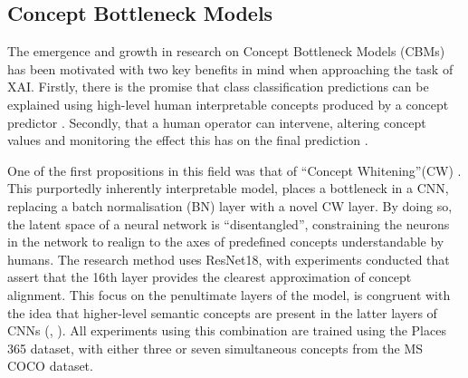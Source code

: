 \subsection{Concept Bottleneck Models}

The emergence and growth in research on Concept Bottleneck Models (CBMs) has been motivated with two key benefits in mind when approaching the task of XAI. Firstly, there is the promise that class classification predictions can be explained using high-level human interpretable concepts produced by a concept predictor \cite{grangeXAISelfexplanatoryAI2022}. Secondly, that a human operator can intervene, altering concept values and monitoring the effect this has on the final prediction \cite{havasiAddressingLeakageConcept2022a}. 

One of the first propositions in this field was that of “Concept Whitening”(CW) \cite{chenConceptWhiteningInterpretable2020}. This purportedly inherently interpretable model, places a bottleneck in a CNN, replacing a batch normalisation (BN) layer with a novel CW layer. By doing so, the latent space of a neural network is “disentangled”, constraining the neurons in the network to realign to the axes of predefined concepts understandable by humans. The research method uses ResNet18, with experiments conducted that assert that the 16th layer provides the clearest approximation of concept alignment. This focus on the penultimate layers of the model, is congruent with the idea that higher-level semantic concepts are present in the latter layers of CNNs (\cite{zhouInterpretingDeepVisual2017}, \cite{grangeXAISelfexplanatoryAI2022}). All experiments using this combination are trained using the Places 365 dataset, with either three or seven simultaneous concepts from the MS COCO dataset.  


